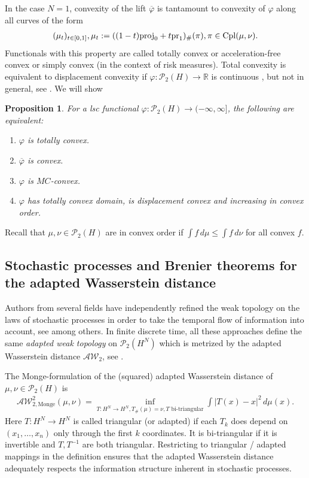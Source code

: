 \documentclass[a4paper]{amsart}
\numberwithin{theorem}{section}
\newtheorem{proposition}[theorem]{Proposition}
\theoremstyle{definition}
\newcommand{\R}{\mathbb{R}}
\newcommand{\pr}{\textup{pr}}
\newcommand{\proj}{\textup{proj}}
\newcommand{\cpl}{\textup{Cpl}}
\newcommand{\AW}{\mathcal{AW}}
\newcommand{\Pc}{\mathcal P}
\renewcommand{\phi}{\varphi}
\begin{document}
In the case $N=1$, convexity of the lift $\overline\phi$ is tantamount to convexity of $\phi$ along all curves of the form
 \begin{align}\label{eq:all_interpolations}
     (\mu_t)_{t\in [0,1]}, \mu_t:=((1-t)\proj_0 + t \pr_1)_{\#} (\pi), \pi\in \cpl(\mu, \nu).
 \end{align}
  Functionals with this property are called totally convex \cite{CaSaSo25} or acceleration-free convex \cite{Pa24} or simply convex (in the context of risk measures).
 Total convexity is equivalent to displacement convexity if $\phi:\Pc_2(H)\to \R$ is continuous \cite{CaSaSo25}, but not in general, see \cite{Pa24}. We will show
 \begin{proposition}\label{pro:ConvexEquivIntro} 
For a lsc functional $\phi : \Pc_2(H) \to (-\infty, \infty]$, the following are equivalent:
\begin{enumerate}
    \item $\phi$ is totally convex.
\item $\overline\phi$ is convex.
\item $\phi$ is $MC$-convex.
    \item $\phi$ has totally convex domain, is displacement convex and  increasing in convex order.
   
\end{enumerate}
\end{proposition}
Recall that  $\mu, \nu\in \Pc_2(H)$ are in convex order %
if $\int f\, d\mu \leq \int f\, d\nu$ for all convex $f$. 



\subsection{Stochastic processes and  Brenier theorems for the adapted Wasserstein distance}\label{sec:AW_intro}

Authors from several fields have independently refined the weak topology on the laws of stochastic processes in order to take the temporal flow of information into account, see \cite{Al81, He96, HeSc02, BiTa19, PfPi12,PfPi14, NiSu20} among others. In finite discrete time, all these approaches define the same \emph{adapted weak topology} on $\Pc_2(H^N)$ which is metrized by the adapted  Wasserstein distance $\AW_2$, see \cite{BaBaBeEd19b, Pa22, BePaPo21}. 


The Monge-formulation of the (squared) adapted Wasserstein distance of $\mu, \nu\in \Pc_2(H)$ is 
\begin{align}
   \AW^2_{2, \text{Monge}} (\mu, \nu) = \inf_{T: H^N  \to H^N, T_{\#}(\mu)=\nu, T \text{ bi-triangular}} \int |T(x)-x|^2 \, d\mu(x).     
\end{align}
Here $T:H^N \to H^N$ is called triangular (or adapted) if each $T_k$ does depend on $(x_1, \ldots, x_n)$ only through the first $k$ coordinates. It is bi-triangular if it is invertible and $T, T^{-1}$ are both triangular. Restricting to triangular / adapted mappings in the definition ensures that the adapted Wasserstein distance adequately respects the information structure inherent in stochastic processes. 
\end{document}

